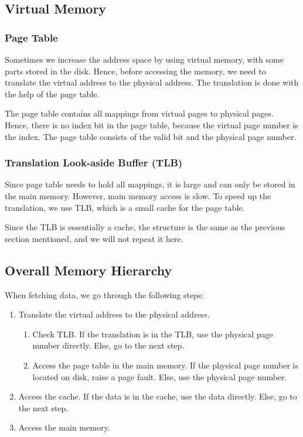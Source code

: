 \documentclass[a4paper,12pt]{article}
\begin{document}
\subsection{Virtual Memory}

\subsubsection{Page Table}

Sometimes we increase the address space by using virtual memory, with some parts stored in the disk. Hence, before accessing the memory, we need to translate the virtual address to the physical address. The translation is done with the help of the page table.

The page table contains all mappings from virtual pages to physical pages. Hence, there is no index bit in the page table, because the virtual page number is the index. The page table consists of the valid bit and the physical page number.

\subsubsection{Translation Look-aside Buffer (TLB)}

Since page table needs to hold all mappings, it is large and can only be stored in the main memory. However, main memory access is slow. To speed up the translation, we use TLB, which is a small cache for the page table. 

Since the TLB is essentially a cache, the structure is the same as the previous section mentioned, and we will not repeat it here.

\subsection{Overall Memory Hierarchy}

When fetching data, we go through the following steps:
\begin{enumerate}
	\item Translate the virtual address to the physical address.
	\begin{enumerate}
		\item Check TLB. If the translation is in the TLB, use the physical page number directly. Else, go to the next step.
		\item Access the page table in the main memory. If the physical page number is located on disk, raise a page fault. Else, use the physical page number.
	\end{enumerate}
	\item Access the cache. If the data is in the cache, use the data directly. Else, go to the next step.
	\item Access the main memory. 
\end{enumerate}
\end{document}
